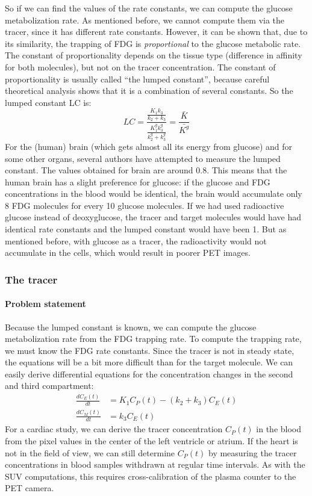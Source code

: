 \documentclass[11pt,oneside]{book}
\begin{document}
So if we can find the values of the rate constants, we can compute the glucose
metabolization rate. As mentioned before, we cannot compute them via the
tracer, since it has different rate constants. However, it can be shown that,
due to its similarity, the trapping of FDG is {\em proportional} to the glucose
metabolic rate. The constant of proportionality depends on the tissue type
(difference in affinity for both molecules), but not on the tracer
concentration. The constant of proportionality is usually called ``the lumped
constant'', because careful theoretical analysis shows that it is a combination
of several constants. So the lumped constant LC is:
\begin{equation}
  LC = \frac{\frac{K_1 k_3}{k_2 + k_3}}{\frac{K_1^g k_3^g}{k_2^g + k_3^g}}
  = \frac{\bar{K}}{\bar{K^g}}
\end{equation}
For the (human) brain (which gets almost all its energy from glucose)
and for some other organs, several authors have attempted to measure
the lumped constant. The values obtained for brain are around
0.8. This means that the human brain has a slight preference for
glucose: if the glucose and FDG concentrations in the blood would be
identical, the brain would accumulate only 8 FDG molecules for every
10 glucose molecules. If we had used radioactive glucose instead of
deoxyglucose, the tracer and target molecules would have had identical
rate constants and the lumped constant would have been 1. But as
mentioned before, with glucose as a tracer, the radioactivity would
not accumulate in the cells, which would result in poorer PET images.

\subsubsection{The tracer}
\paragraph{Problem statement\\}
Because the lumped constant is known, we can compute the glucose
metabolization rate from the FDG trapping rate. To compute the trapping rate,
we must know the FDG rate constants. Since the tracer is not in steady state,
the equations will be a bit more difficult than for the target molecule.  We
can easily derive differential equations for the concentration changes in the
second and third compartment:
\begin{align}
  \frac{dC_E(t)}{dt} &= K_1 C_P(t) - (k_2 + k_3) C_E(t) \label{eq:C_E}\\
  \frac{dC_M(t)}{dt} &= k_3 C_E(t) \label{eq:C_M}
\end{align}
For a cardiac study, we can derive the tracer concentration $C_P(t)$ in the
blood from the pixel values in the center of the left ventricle or atrium. If
the heart is not in the field of view, we can still determine $C_P(t)$ by
measuring the tracer concentrations in blood samples withdrawn at regular time
intervals.  As with the SUV computations, this requires cross-calibration of
the plasma counter to the PET camera.
\end{document}
